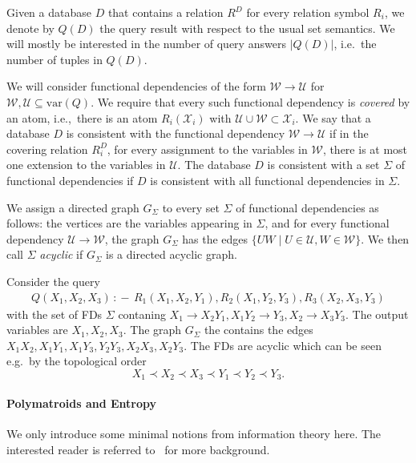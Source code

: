 \documentclass[a4paper,cleveref]{lipics-v2021}
\newcommand{\var}{\mathrm{var}}
\newcommand{\vset}[1]{\mathcal{#1}}
\newcommand{\datarule}{{\,:\!\!-\,}}
\begin{document}
Given a database $D$ that contains a relation $R^D$ for every relation symbol $R_i$, we denote by $Q(D)$ the query result with respect to the usual set semantics. We will mostly be interested in the number of query answers $|Q(D)|$, i.e.~the number of tuples in $Q(D)$.

We will consider functional dependencies of the form $\vset W \rightarrow \vset U$ for $\vset W, \vset U\subseteq \var(Q)$. We require that every such functional dependency is \emph{covered} by an atom, i.e.,~there is an atom $R_i(\vset X_i)$ with $\vset U\cup \vset W \subset \vset X_i$. We say that a database $D$ is consistent with the functional dependency $\vset W \rightarrow \vset U$ if in the covering relation $R_i^D$, for every assignment to the variables in $\vset W$, there is at most one extension to the variables in $\vset U$. The database $D$ is consistent with a set $\Sigma$ of functional dependencies if $D$ is consistent with all functional dependencies in $\Sigma$.

\label{directed-graph}
We assign a directed graph $G_\Sigma$ to every set $\Sigma$ of functional dependencies as follows: the vertices are the variables appearing in $\Sigma$, and for every functional dependency $\vset U \rightarrow \vset W$, the graph $G_\Sigma$ has the edges $\{UW\mid U\in \vset U, W\in \vset W\}$. We then call $\Sigma$ \emph{acyclic} if $G_\Sigma$ is a directed acyclic graph.

\begin{example}\label{ex:acyclic}
	Consider the query 
	\begin{align*}
		Q(X_1,X_2, X_3) \datarule R_1(X_1, X_2, Y_1),R_2(X_1, Y_2, Y_3),R_3(X_2, X_3, Y_3)
	\end{align*}
	with the set of FDs $\Sigma $ contaning $X_1\rightarrow X_2Y_1, X_1Y_2\rightarrow Y_3, X_2 \rightarrow X_3Y_3$. The output variables are $X_1, X_2, X_3$. The graph $G_\Sigma$ the contains the edges $X_1 X_2, X_1Y_1, X_1Y_3, Y_2Y_3, X_2X_3, X_2Y_3$. The FDs are acyclic which can be seen e.g.~by the topological order 
	\[
X_1 \prec X_2  \prec  X_3  \prec   Y_1  \prec  Y_2 \prec  Y_3.
	\] 
\end{example}

\paragraph*{Polymatroids and Entropy}

We only introduce some minimal notions from information theory here. The interested reader is referred to~\cite{Yeung12} for more background.
\end{document}
